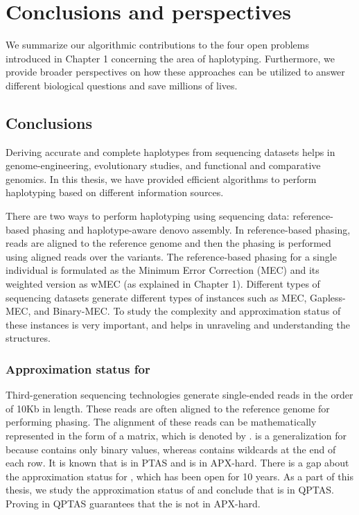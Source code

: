 \chapter{Conclusions and perspectives}
We summarize our algorithmic contributions to the four open problems introduced in Chapter 1 concerning the area of haplotyping.
Furthermore, we provide broader perspectives on how these approaches can be utilized to answer different biological questions and save millions of lives.

\section{Conclusions}
Deriving accurate and complete haplotypes from sequencing datasets helps in genome-engineering, evolutionary studies, and functional and comparative genomics.
In this thesis, we have provided efficient algorithms to perform haplotyping based on different information sources.

There are two ways to perform haplotyping using sequencing data: reference-based phasing and haplotype-aware denovo assembly.
In reference-based phasing, reads are aligned to the reference genome and then the phasing is performed using aligned reads over the variants.
The reference-based phasing for a single individual is formulated as the Minimum Error Correction (MEC) and its weighted version as wMEC (as explained in Chapter 1).
Different types of sequencing datasets generate different types of instances such as MEC, Gapless-MEC, and Binary-MEC.
To study the complexity and approximation status of these instances is very important, and helps in unraveling and understanding the structures.

\subsection{Approximation status for \GMEC}
Third-generation sequencing technologies generate single-ended reads in the order of 10Kb in length. These reads are often aligned to the reference genome for performing phasing.
The alignment of these reads can be mathematically represented in the form of a matrix, which is denoted by \GMEC.
\GMEC is a generalization for \BMEC because \BMEC contains only binary values, whereas \GMEC contains wildcards at the end of each row. 
It is known that \BMEC is in PTAS and \MEC is in APX-hard.
There is a gap about the approximation status for \GMEC, which has been open for 10 years.  
As a part of this thesis, we study the approximation status of \GMEC and conclude that \GMEC is in QPTAS.
Proving \GMEC in QPTAS guarantees that the \GMEC is not in APX-hard.


